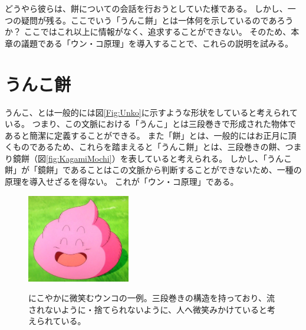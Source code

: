 どうやら彼らは、餅についての会話を行おうとしていた様である。
しかし、一つの疑問が残る。ここでいう「うんこ餅」とは一体何を示しているのであろうか？
ここではこれ以上に情報がなく、追求することができない。
そのため、本章の議題である「ウン・コ原理」を導入することで、これらの説明を試みる。

\section{うんこ餅}
うんこ、とは一般的には図\ref{Fig:Unko}に示すような形状をしていると考えられている。
つまり、この文脈における「うんこ」とは三段巻きで形成された物体であると簡潔に定義することができる。
また「餅」とは、一般的にはお正月に頂くものであるため、これらを踏まえると「うんこ餅」とは、三段巻きの餅、つまり鏡餅（図\ref{fig:KagamiMochi}）を表していると考えられる。
しかし、「うんこ餅」が「鏡餅」であることはこの文脈から判断することができないため、一種の原理を導入せざるを得ない。
これが「ウン・コ原理」である。

\begin{figure}[htbp]
\begin{center}
\includegraphics[width=0.4\textwidth]{./section/UnkoGenri/figure/Unko.jpg}
  \label{fig:Unko}
  \caption{にこやかに微笑むウンコの一例。三段巻きの構造を持っており、流されないように・捨てられないように、人へ微笑みかけていると考えられている。}
\end{center}
\end{figure}

